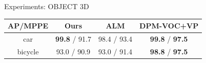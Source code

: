 \documentclass[serif,mathserif,final]{beamer}
\newcommand{\1}{\mathbb{I}} %
\begin{document}
\begin{frame}{}
\begin{columns}[t]
\begin{column}{0.3\linewidth}
\begin{block}{Experiments: OBJECT 3D}
        \begin{table}[!htbp]
          \begin{center}
            \begin{tabular}{|c|c|c|c|}
            \hline
            AP/MPPE& Ours & ALM & DPM-VOC+VP \\
            \hline\hline
            car     & \textbf{99.8} / 91.7 & 98.4 / 93.4 & \textbf{99.8} / \textbf{97.5} \\ 
            bicycle & 93.0 / 90.9          & 93.0 / 91.4 & \textbf{98.8} / \textbf{97.5} \\
            \hline
            \end{tabular}
          \end{center}
        \end{table}


      \end{block}
    \end{column}


\end{columns}
\end{frame}
\end{document}
